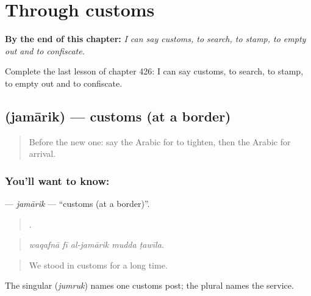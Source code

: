 
\chapter{Through customs}
\label{ch:ar-through-customs}

\begin{chapteropening}
\textbf{By the end of this chapter:} \emph{I can say customs, to search, to stamp, to empty out and to confiscate.}

Complete the last lesson of chapter 426: I can say customs, to search, to stamp, to empty out and to confiscate.
\end{chapteropening}

\section[\texorpdfstring{\ar{جمارك} (jamārik)}{جمارك (jamārik)}]{ (jamārik) — customs (at a border)}

\label{lesson:AR-C426-jamarik}



\begin{quote}
Before the new one: say the Arabic for to tighten, then the Arabic for arrival.
\end{quote}

\subsection*{You'll want to know: }
\textbf{} — \emph{jamārik} — \textquotedblleft{}customs (at a border)\textquotedblright{}.

\begin{quote}
    .
\end{quote}

\begin{quote}
\emph{waqafnā fī al-jamārik mudda ṭawīla.}
\end{quote}

\begin{quote}
We stood in customs for a long time.
\end{quote}

The singular  (\emph{jumruk}) names one customs post; the plural names the service.

